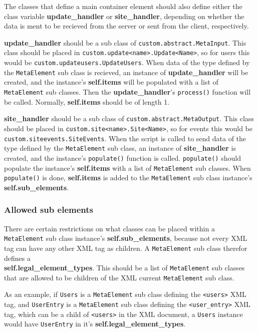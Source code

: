 The classes that define a main container element should also define either the
class variable \textbf{update\_handler} or \textbf{site\_handler}, depending on
whether the data is ment to be recieved from the server or sent from the
client, respectively. 

\textbf{update\_handler} should be a sub class of
\texttt{custom.abstract.MetaInput}. This class should be placed in
\texttt{custom.update<name>.Update<Name>}, so for users this would be
\texttt{custom.updateusers.UpdateUsers}. When data of the type defined by the
\texttt{MetaElement} sub class is recieved, an instance of
\textbf{update\_handler} will be created, and the instance's
\textbf{self.items} will be populated with a list of \texttt{MetaElement} sub
classes. Then the \textbf{update\_handler}'s \texttt{process()} function will
be called.  Normally, \textbf{self.items} should be of length 1.

\textbf{site\_handler} should be a sub class of
\texttt{custom.abstract.MetaOutput}. This class should be placed in
\texttt{custom.site<name>.Site<Name>}, so for events this would be
\texttt{custom.siteevents.SiteEvents}. When the script is called to send data
of the type defined by the \texttt{MetaElement} sub class, an instance of
\textbf{site\_handler} is created, and the instance's \texttt{populate()}
function is called. \texttt{populate()} should populate the instance's
\textbf{self.items} with a list of \texttt{MetaElement} sub classes. When
\texttt{populate()} is done, \textbf{self.items} is added to the
\texttt{MetaElement} sub class instance's \textbf{self.sub\_elements}.

\subsubsection{Allowed sub elements}
There are certain restrictions on what classes can be placed within a
\texttt{MetaElement} sub class instance's \textbf{self.sub\_elements}, because
not every XML tag can have any other XML tag as children. A
\texttt{MetaElement} sub class therefor defines a \\
\textbf{self.legal\_element\_types}. This should be a list of
\texttt{MetaElement} sub classes that are allowed to be children of the XML
current \texttt{MetaElement} sub class. 

As an example, if \texttt{Users} is a \texttt{MetaElement} sub class defining
the \texttt{<users>} XML tag, and \texttt{UserEntry} is a \texttt{MetaElement}
sub class defining the \texttt{<user\_entry>} XML tag, which can be a child of
\texttt{<users>} in the XML document, a \texttt{Users} instance would have
\texttt{UserEntry} in it's \textbf{self.legal\_element\_types}.

